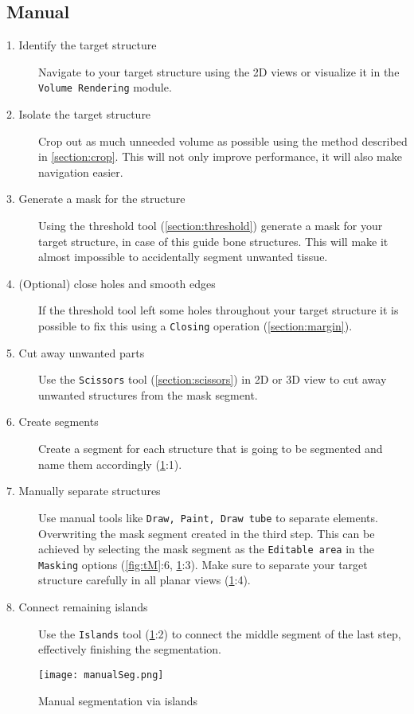 \subsection{Manual}
\begin{description}
	\item [1. Identify the target structure] Navigate to your target structure using the 2D views or visualize it in the \texttt{Volume Rendering} module.
	\item [2. Isolate the target structure] Crop out as much unneeded volume as possible using the method described in \cref{section:crop}. This will not only improve performance, it will also make navigation easier.
	\item [3. Generate a mask for the structure] Using the threshold tool (\cref{section:threshold}) generate a mask for your target structure, in case of this guide bone structures. This will make it almost impossible to accidentally segment unwanted tissue.
	\item [4. (Optional) close holes and smooth edges] If the threshold tool left some holes throughout your target structure it is possible to fix this using a \texttt{Closing} operation (\cref{section:margin}).
	\item [5. Cut away unwanted parts] Use the \texttt{Scissors} tool (\cref{section:scissors}) in 2D or 3D view to cut away unwanted structures from the mask segment.
	\item [6. Create segments] Create a segment for each structure that is going to be segmented and name them accordingly (\cref{fig:manualSeg}:1).
	\item [7. Manually separate structures] Use manual tools like \texttt{Draw, Paint, Draw tube} to separate elements. Overwriting the mask segment created in the third step. This can be achieved by selecting the mask segment as the \texttt{Editable area} in the \texttt{Masking} options (\cref{fig:tM}:6, \cref{fig:manualSeg}:3). Make sure to separate your target structure carefully in all planar views (\cref{fig:manualSeg}:4).
	\item [8. Connect remaining islands] Use the \texttt{Islands} tool (\cref{fig:manualSeg}:2) to connect the middle segment of the last step, effectively finishing the segmentation.\end{description}
\begin{figure}[h!]
	\centerline{
		\texttt{[image: manualSeg.png]}}
	\caption{Manual segmentation via islands}\label{fig:manualSeg}
\end{figure}

